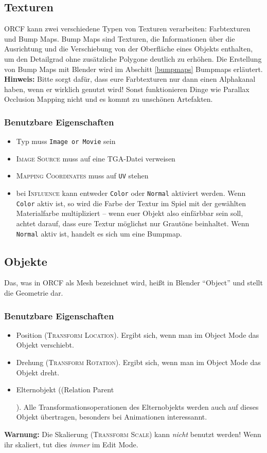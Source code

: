 \documentclass[a4paper]{article}
\newcommand{\ccaption}[1]{\textsc{#1}}
\newcommand{\cvalue}[1]{\texttt{#1}}
\newcommand{\note}[1]{\textbf{Hinweis:} #1 \par}
\newcommand{\warning}[1]{\textbf{Warnung:} #1 \par}
\newcommand{\rarrow}{\textrightarrow}
\begin{document}
\subsection{Texturen}
\label{objects_textures}
ORCF kann zwei verschiedene Typen von Texturen verarbeiten: Farbtexturen und Bump Maps. Bump Maps sind Texturen, die Informationen über die Ausrichtung
und die Verschiebung von der Oberfläche eines Objekts enthalten, um den Detailgrad ohne zusätzliche Polygone deutlich zu erhöhen. Die Erstellung von
Bump Maps mit Blender wird im Abschitt \ref{bumpmaps} Bumpmaps erläutert.
\note{Bitte sorgt dafür, dass eure Farbtexturen nur dann einen Alphakanal haben, wenn er wirklich genutzt wird! Sonst funktionieren Dinge wie Parallax
  Occlusion Mapping nicht und es kommt zu unschönen Artefakten.

\subsubsection{Benutzbare Eigenschaften}
\begin{itemize}
\item Typ muss \cvalue{Image or Movie} sein
\item \ccaption{Image \rarrow Source} muss auf eine TGA-Datei verweisen
\item \ccaption{Mapping \rarrow Coordinates} muss auf \cvalue{UV} stehen
\item bei \ccaption{Influence} kann entweder \cvalue{Color} oder \cvalue{Normal} aktiviert werden. Wenn \cvalue{Color} aktiv ist, so wird die Farbe
  der Textur im Spiel mit der gewählten Materialfarbe multipliziert -- wenn euer Objekt also einfärbbar sein soll, achtet darauf, dass eure Textur
  möglichst nur Grautöne beinhaltet. Wenn \cvalue{Normal} aktiv ist, handelt es sich um eine Bumpmap.
\end{itemize}

\subsection{Objekte}
Das, was in ORCF als Mesh bezeichnet wird, heißt in Blender "`Object"' und stellt die Geometrie dar.

\subsubsection{Benutzbare Eigenschaften}
\begin{itemize}
\item Position (\ccaption{Transform \rarrow Location}). Ergibt sich, wenn man im Object Mode das Objekt verschiebt.
\item Drehung (\ccaption{Transform \rarrow Rotation}). Ergibt sich, wenn man im Object Mode das Objekt dreht.
\item Elternobjekt (\ccaption(Relation \rarrow Parent}). Alle Transformationsoperationen des Elternobjekts werden auch auf dieses Objekt übertragen,
  besonders bei Animationen interessannt.
\end{itemize}
\warning{Die Skalierung (\ccaption{Transform \rarrow Scale}) kann \emph{nicht} benutzt werden! Wenn ihr skaliert, tut dies \emph{immer} im Edit Mode.}
\end{document}
